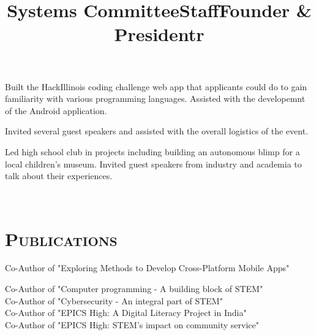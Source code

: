 \begin{resume}
\title{Systems Committee}
\begin{position}
Built the HackIllinois coding challenge web app that applicants could do to gain familiarity with various programming languages. Assisted with the developemnt of the Android application.
\end{position}

\title{Staff}
\begin{position}
Invited several guest speakers and assisted with the overall logistics of the event.
\end{position}

\title{Founder \& President}
\begin{position}
Led high school club in projects including building an autonomous blimp for a local children's museum. Invited guest speakers from industry and academia to talk about their experiences.
\end{position}

\begin{formatb}
  \title{r}\\
\end{formatb}

\section{\textsc{Publications}}

\title{}
\begin{position}
Co-Author of "Exploring Methods to Develop Cross-Platform Mobile Apps"
\end{position}

\title{}
\begin{position}
Co-Author of "Computer programming - A building block of STEM" \\
Co-Author of "Cybersecurity - An integral part of STEM" \\
Co-Author of "EPICS High: A Digital Literacy Project in India" \\
Co-Author of "EPICS High: STEM's impact on community service"
\end{position}

\end{resume}

